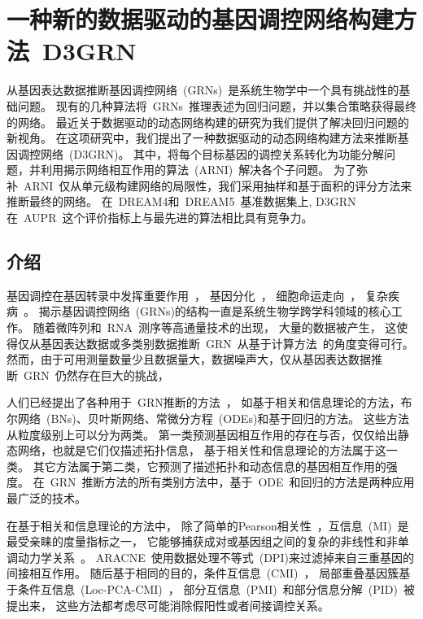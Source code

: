 \section{一种新的数据驱动的基因调控网络构建方法~D3GRN}

从基因表达数据推断基因调控网络~(GRNs)~是系统生物学中一个具有挑战性的基础问题。
现有的几种算法将~GRNs~推理表述为回归问题，并以集合策略获得最终的网络。
最近关于数据驱动的动态网络构建的研究为我们提供了解决回归问题的新视角。
在这项研究中，我们提出了一种数据驱动的动态网络构建方法来推断基因调控网络~(D3GRN)。
其中，将每个目标基因的调控关系转化为功能分解问题，并利用揭示网络相互作用的算法~(ARNI)~解决各个子问题。
为了弥补~ARNI~仅从单元级构建网络的局限性，我们采用抽样和基于面积的评分方法来推断最终的网络。
在~DREAM4和~DREAM5~基准数据集上, D3GRN在~AUPR~这个评价指标上与最先进的算法相比具有竞争力。

\subsection{介绍}
基因调控在基因转录中发挥重要作用~\cite{lee2002transcriptional,harbison2004transcriptional}，
基因分化~\cite{matsumoto2017scode}，
细胞命运走向~\cite{chen2014single,trapnell2014dynamics}，
复杂疾病~\cite{boyle2017expanded}。
揭示基因调控网络~(GRNs)的结构一直是系统生物学跨学科领域的核心工作。
随着微阵列和~RNA~测序等高通量技术的出现，
大量的数据被产生，
这使得仅从基因表达数据或多类别数据推断~GRN~从基于计算方法~\cite{maetschke2013supervised}的角度变得可行。
然而，由于可用测量数量少且数据量大，数据噪声大，仅从基因表达数据推断~GRN~仍然存在巨大的挑战，

人们已经提出了各种用于~GRN推断的方法~\cite{karlebach2008modelling,le2015quantitative,huynh2018gene}，
如基于相关和信息理论的方法，布尔网络~(BNs)、贝叶斯网络、常微分方程~(ODEs)和基于回归的方法。
这些方法从粒度级别上可以分为两类。
第一类预测基因相互作用的存在与否，仅仅给出静态网络，也就是它们仅描述拓扑信息，
基于相关性和信息理论的方法属于这一类。
其它方法属于第二类，它预测了描述拓扑和动态信息的基因相互作用的强度。
在~GRN~推断方法的所有类别方法中，基于~ODE~和回归的方法是两种应用最广泛的技术。

在基于相关和信息理论的方法中，
除了简单的Pearson相关性~\cite{stuart2003gene}，互信息~(MI)~\cite{steuer2002mutual}是最受亲睐的度量指标之一，
它能够捕获成对或基因组之间的复杂的非线性和非单调动力学关系~\cite{uda2013robustness,mc2015information}。
ARACNE~\cite{basso2005reverse}使用数据处理不等式~(DPI)来过滤掉来自三重基因的间接相互作用。
随后基于相同的目的，条件互信息~(CMI)~\cite{zhang2011inferring}，
局部重叠基因簇基于条件互信息~(Loc-PCA-CMI)~\cite{8660530}，
部分互信息~(PMI)~\cite{zhao2016part}和部分信息分解~(PID)~\cite{chan2017gene}被提出来，
这些方法都考虑尽可能消除假阳性或者间接调控关系。

